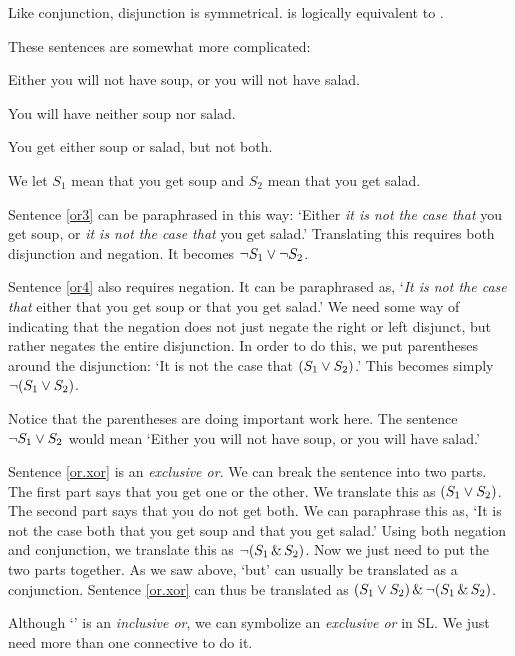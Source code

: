 Like conjunction, disjunction is symmetrical. \eor{} is logically equivalent to \eor{}.


These sentences are somewhat more complicated:

\begin{earg}
\item[\ex{or3}] Either you will not have soup, or you will not have salad.
\item[\ex{or4}] You will have neither soup nor salad.
\item[\ex{or.xor}] You get either soup or salad, but not both.
\end{earg}

We let $S_1$ mean that you get soup and $S_2$ mean that you get salad.

Sentence \ref{or3} can be paraphrased in this way: `Either \emph{it is not the case that} you get soup, or \emph{it is not the case that} you get salad.' Translating this requires both disjunction and negation. It becomes $\neg S_1 \vee \neg S_2$.

Sentence \ref{or4} also requires negation. It can be paraphrased as, `\emph{It is not the case that} either that you get soup or that you get salad.' We need some way of indicating that the negation does not just negate the right or left disjunct, but rather negates the entire disjunction. In order to do this, we put parentheses around the disjunction: `It is not the case that $(S_1 \vee S_2)$.' This becomes simply $\neg (S_1 \vee S_2)$.

Notice that the parentheses are doing important work here. The sentence $\neg S_1 \vee S_2$ would mean `Either you will not have soup, or you will have salad.'

Sentence \ref{or.xor} is an \emph{exclusive or}. We can break the sentence into two parts. The first part says that you get one or the other. We translate this as $(S_1 \vee S_2)$. The second part says that you do not get both. We can paraphrase this as, `It is not the case both that you get soup and that you get salad.' Using both negation and conjunction, we translate this as $\neg(S_1 \,\&\, S_2)$. Now we just need to put the two parts together. As we saw above, `but' can usually be translated as a conjunction. Sentence \ref{or.xor} can thus be translated as $(S_1 \vee S_2) \,\&\, \neg(S_1 \,\&\, S_2)$.

Although `\eor' is an \emph{inclusive or}, we can symbolize an \emph{exclusive or} in {SL}. We just need more than one connective to do it.

